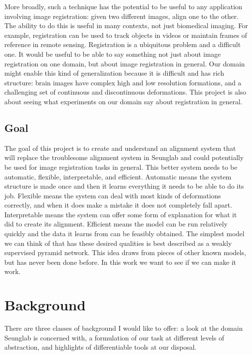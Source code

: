 \documentclass[12pt,a4paper]{article}
\begin{document}
More broadly, such a technique has the potential to be useful to any application involving image registration: given two different images, align one to the other. The ability to do this is useful in many contexts, not just biomedical imaging. For example, registration can be used to track objects in videos or maintain frames of reference in remote sensing. Registration is a ubiquitous problem and a difficult one. It would be useful to be able to say something not just about image registration on one domain, but about image registration in general. Our domain might enable this kind of generalization because it is difficult and has rich structure: brain images have complex high and low resolution formations, and a challenging set of continuous and discontinuous deformations.
This project is also about seeing what experiments on our domain say about registration in general.
\subsection{Goal}

The goal of this project is to create and understand an alignment system that will replace the troublesome alignment system in Seunglab and could potentially be used for image registration tasks in general. This better system needs to be automatic, flexible, interpretable, and efficient. Automatic means the system structure is made once and then it learns everything it needs to be able to do its job. Flexible means the system can deal with most kinds of deformations correctly, and when it does make a mistake it does not completely fall apart. Interpretable means the system can offer some form of explanation for what it did to create its alignment. Efficient means the model can be run relatively quickly and the data it learns from can be feasibly obtained. The simplest model we can think of that has these desired qualities is best described as a weakly supervised pyramid network. This idea draws from pieces of other known models, but has never been done before. In this work we want to see if we can make it work.

\newpage



\section{Background}

There are three classes of background I would like to offer: a look at the domain Seunglab is concerned with, a formulation of our task at different levels of abstraction, and highlights of differentiable tools at our disposal.
\end{document}
